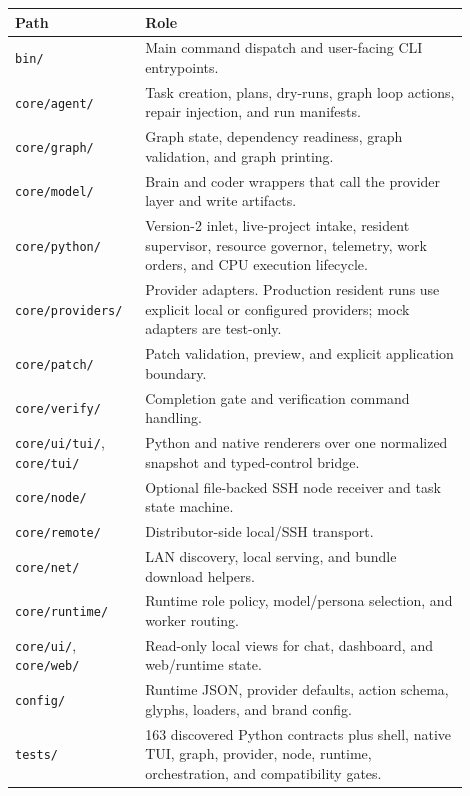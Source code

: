 \documentclass[11pt,a4paper]{article}
\begin{document}
\begin{longtable}{@{}p{0.24\linewidth}p{0.66\linewidth}@{}}
\toprule
Path & Role \\
\midrule
\texttt{bin/} & Main command dispatch and user-facing CLI entrypoints. \\
\texttt{core/agent/} & Task creation, plans, dry-runs, graph loop actions, repair injection, and run manifests. \\
\texttt{core/graph/} & Graph state, dependency readiness, graph validation, and graph printing. \\
\texttt{core/model/} & Brain and coder wrappers that call the provider layer and write artifacts. \\
\texttt{core/python/} & Version-2 inlet, live-project intake, resident supervisor, resource governor, telemetry, work orders, and CPU execution lifecycle. \\
\texttt{core/providers/} & Provider adapters. Production resident runs use explicit local or configured providers; mock adapters are test-only. \\
\texttt{core/patch/} & Patch validation, preview, and explicit application boundary. \\
\texttt{core/verify/} & Completion gate and verification command handling. \\
\texttt{core/ui/tui/}, \texttt{core/tui/} & Python and native renderers over one normalized snapshot and typed-control bridge. \\
\texttt{core/node/} & Optional file-backed SSH node receiver and task state machine. \\
\texttt{core/remote/} & Distributor-side local/SSH transport. \\
\texttt{core/net/} & LAN discovery, local serving, and bundle download helpers. \\
\texttt{core/runtime/} & Runtime role policy, model/persona selection, and worker routing. \\
\texttt{core/ui/}, \texttt{core/web/} & Read-only local views for chat, dashboard, and web/runtime state. \\
\texttt{config/} & Runtime JSON, provider defaults, action schema, glyphs, loaders, and brand config. \\
\texttt{tests/} & 163 discovered Python contracts plus shell, native TUI, graph, provider, node, runtime, orchestration, and compatibility gates. \\
\bottomrule
\end{longtable}
\end{document}

